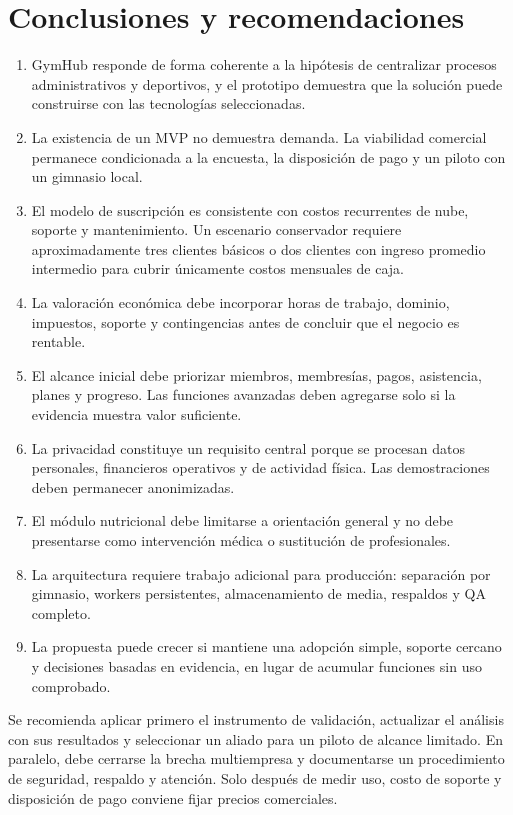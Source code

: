 \section{Conclusiones y recomendaciones}

\begin{enumerate}
  \item GymHub responde de forma coherente a la hipótesis de centralizar procesos
  administrativos y deportivos, y el prototipo demuestra que la solución puede
  construirse con las tecnologías seleccionadas.
  \item La existencia de un MVP no demuestra demanda. La viabilidad comercial
  permanece condicionada a la encuesta, la disposición de pago y un piloto con
  un gimnasio local.
  \item El modelo de suscripción es consistente con costos recurrentes de nube,
  soporte y mantenimiento. Un escenario conservador requiere aproximadamente
  tres clientes básicos o dos clientes con ingreso promedio intermedio para
  cubrir únicamente costos mensuales de caja.
  \item La valoración económica debe incorporar horas de trabajo, dominio,
  impuestos, soporte y contingencias antes de concluir que el negocio es
  rentable.
  \item El alcance inicial debe priorizar miembros, membresías, pagos, asistencia,
  planes y progreso. Las funciones avanzadas deben agregarse solo si la evidencia
  muestra valor suficiente.
  \item La privacidad constituye un requisito central porque se procesan datos
  personales, financieros operativos y de actividad física. Las demostraciones
  deben permanecer anonimizadas.
  \item El módulo nutricional debe limitarse a orientación general y no debe
  presentarse como intervención médica o sustitución de profesionales.
  \item La arquitectura requiere trabajo adicional para producción: separación
  por gimnasio, workers persistentes, almacenamiento de media, respaldos y QA
  completo.
  \item La propuesta puede crecer si mantiene una adopción simple, soporte cercano
  y decisiones basadas en evidencia, en lugar de acumular funciones sin uso
  comprobado.
\end{enumerate}

Se recomienda aplicar primero el instrumento de validación, actualizar el análisis
con sus resultados y seleccionar un aliado para un piloto de alcance limitado. En
paralelo, debe cerrarse la brecha multiempresa y documentarse un procedimiento de
seguridad, respaldo y atención. Solo después de medir uso, costo de soporte y
disposición de pago conviene fijar precios comerciales.

